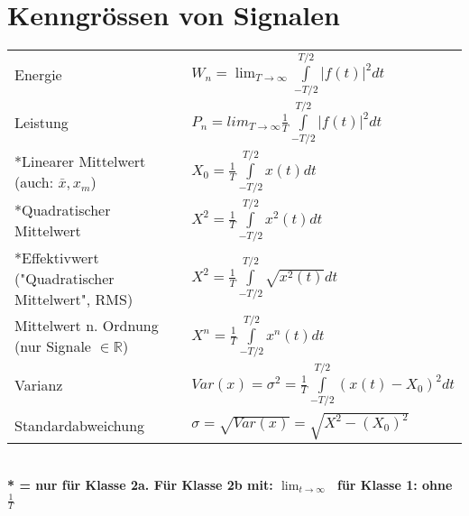 \section{Kenngrössen von Signalen}
\begin{tabular}{p{6cm}p{12cm}}
  Energie                                                            &
  $W_n = \lim_{T \to \infty}  \int \limits _{-T/2} ^{T/2} |f(t)|^2 dt$            \\
  Leistung                                                           &
  $P_n = lim_{T \to \infty} \frac{1}{T} \int \limits _{-T/2} ^{T/2} |f(t)|^2 dt$  \\
  *Linearer Mittelwert
  \newline \tiny(auch: $ \bar{x}, x_m$)                              &
  $X_0 = \frac{1}{T} \int \limits _{-T/2}^{T/2} x(t) dt $                         \\
  *Quadratischer Mittelwert                                          &
  $X^2 = \frac{1}{T} \int \limits _{-T/2}^{T/2} x^2(t) dt$                        \\
  *Effektivwert \newline \tiny{("Quadratischer Mittelwert", RMS)}    &
  $X^2 = \frac{1}{T} \int \limits _{-T/2}^{T/2} \sqrt{x^2(t)} dt $                \\
  Mittelwert n. Ordnung \newline \tiny(nur Signale $\in \mathbb{R}$) &
  $X^n = \frac{1}{T} \int \limits _{-T/2} ^{T/2} x^n(t)dt$                        \\
  Varianz                                                            &
  $Var(x) = \sigma^2 = \frac{1}{T} \int \limits _{-T/2} ^{T/2} (x(t) - X_0)^2 dt$ \\
  Standardabweichung                                                 &
  $\sigma = \sqrt{Var(x)} = \sqrt{X^2 - (X_0)^2}$                                 \\
\end{tabular}\\
\textbf{* = nur für Klasse 2a.
  Für Klasse 2b mit: $\lim_{t \to \infty}\;$ für Klasse 1: ohne $\frac{1}{T}$ }

